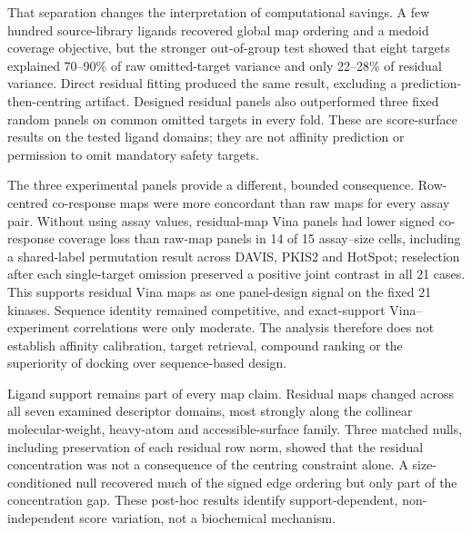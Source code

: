 \documentclass[11pt]{article}
\begin{document}
That separation changes the interpretation of computational savings. A few
hundred source-library ligands recovered global map ordering and a medoid
coverage objective, but the stronger out-of-group test showed that eight targets
explained 70--90\% of raw omitted-target variance and only 22--28\% of residual
variance. Direct residual fitting produced the same result, excluding a
prediction-then-centring artifact. Designed residual panels also outperformed
three fixed random panels on common omitted targets in every fold. These are
score-surface results on the tested ligand domains; they are not affinity
prediction or permission to omit mandatory safety targets.

The three experimental panels provide a different, bounded consequence.
Row-centred co-response maps were more concordant than raw maps for every assay
pair. Without using assay values, residual-map Vina panels had lower signed
co-response coverage loss than raw-map panels in 14 of 15 assay--size cells,
including a shared-label permutation result across DAVIS, PKIS2 and HotSpot;
reselection after each single-target omission preserved a positive joint
contrast in all 21 cases.
This supports residual Vina maps as one panel-design signal on the fixed 21
kinases. Sequence identity remained competitive, and exact-support
Vina--experiment correlations were only moderate. The analysis therefore does
not establish affinity calibration, target retrieval, compound ranking or the
superiority of docking over sequence-based design.

Ligand support remains part of every map claim. Residual maps changed across
all seven examined descriptor domains, most strongly along the collinear
molecular-weight, heavy-atom and accessible-surface family. Three matched nulls,
including preservation of each residual row norm, showed that the residual
concentration was not a consequence of the centring constraint alone. A
size-conditioned null recovered much of the signed edge ordering but only part
of the concentration gap. These post-hoc results identify support-dependent,
non-independent score variation, not a biochemical mechanism.
\end{document}
